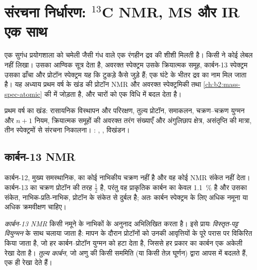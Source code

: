 \chapter{संरचना निर्धारण: \texorpdfstring{$^{13}$C}{13C} NMR, MS और IR एक साथ}\label{ch:b2:structure-determination}

एक सुगंध प्रयोगशाला को चमेली जैसी गंध वाले एक रंगहीन द्रव की शीशी मिलती है। किसी ने कोई
लेबल नहीं लिखा।  उसका आण्विक सूत्र देता है, अवरक्त स्पेक्ट्रम उसके क्रियात्मक
समूह, कार्बन-13 स्पेक्ट्रम उसका ढाँचा और प्रोटॉन स्पेक्ट्रम यह कि टुकड़े कैसे जुड़े हैं; एक
घंटे के भीतर द्रव का नाम मिल जाता है। यह अध्याय प्रथम वर्ष के खंड की प्रोटॉन NMR और अवरक्त स्पेक्ट्रमिकी
तथा \cref{ch:b2:mass-spec-atomic} की  में  जोड़ता है, और चारों को
एक विधि में बदल देता है।

\begin{recall}
प्रथम वर्ष का खंड: रासायनिक विस्थापन और परिरक्षण, तुल्य प्रोटॉन, समाकलन, चक्रण--चक्रण युग्मन
और $n + 1$ नियम, क्रियात्मक समूहों की अवरक्त तरंग संख्याएँ और अंगुलिछाप क्षेत्र, असंतृप्ति
की मात्रा, तीन स्पेक्ट्रमों से संरचना निकालना। : , , विखंडन।
\end{recall}

\section{कार्बन-13 NMR}

कार्बन-12, मुख्य समस्थानिक, का कोई नाभिकीय चक्रण नहीं है और वह कोई NMR संकेत नहीं देता। कार्बन-13 का चक्रण
प्रोटॉन की तरह $\tfrac12$ है, परंतु वह प्राकृतिक कार्बन का केवल 1.1~\% है और उसका संकेत,
नाभिक-प्रति-नाभिक, प्रोटॉन के संकेत से दुर्बल है; अतः कार्बन स्पेक्ट्रम के लिए अधिक नमूना या अधिक क्रमवीक्षण चाहिए।

\begin{definition}[कार्बन-13 NMR]\label{def:b2:structure-determination:c13}
\emph{कार्बन-13 NMR} किसी नमूने के  नाभिकों के अनुनाद अभिलिखित करता है।
इसे प्रायः \emph{विस्तृत-पट्ट वियुग्मन} के साथ चलाया जाता है: मापन के दौरान
प्रोटॉनों को उनकी आवृत्तियों के पूरे परास पर विकिरित किया जाता है, जो हर
कार्बन--प्रोटॉन युग्मन को हटा देता है, जिससे हर प्रकार का कार्बन एक अकेली रेखा देता है। \emph{तुल्य
कार्बन}, जो अणु की किसी सममिति (या किसी तेज़ घूर्णन) द्वारा आपस में बदलते हैं,
एक ही रेखा देते हैं।
\end{definition}

